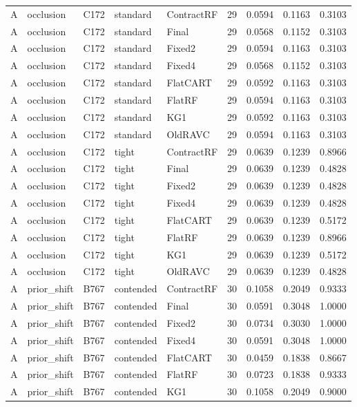 \begin{longtable}{@{}lllllllll@{}}
A & occlusion & C172 & standard & ContractRF & 29 & 0.0594 & 0.1163 & 0.3103\\
A & occlusion & C172 & standard & Final & 29 & 0.0568 & 0.1152 & 0.3103\\
A & occlusion & C172 & standard & Fixed2 & 29 & 0.0594 & 0.1163 & 0.3103\\
A & occlusion & C172 & standard & Fixed4 & 29 & 0.0568 & 0.1152 & 0.3103\\
A & occlusion & C172 & standard & FlatCART & 29 & 0.0592 & 0.1163 & 0.3103\\
A & occlusion & C172 & standard & FlatRF & 29 & 0.0594 & 0.1163 & 0.3103\\
A & occlusion & C172 & standard & KG1 & 29 & 0.0592 & 0.1163 & 0.3103\\
A & occlusion & C172 & standard & OldRAVC & 29 & 0.0594 & 0.1163 & 0.3103\\
A & occlusion & C172 & tight & ContractRF & 29 & 0.0639 & 0.1239 & 0.8966\\
A & occlusion & C172 & tight & Final & 29 & 0.0639 & 0.1239 & 0.4828\\
A & occlusion & C172 & tight & Fixed2 & 29 & 0.0639 & 0.1239 & 0.4828\\
A & occlusion & C172 & tight & Fixed4 & 29 & 0.0639 & 0.1239 & 0.4828\\
A & occlusion & C172 & tight & FlatCART & 29 & 0.0639 & 0.1239 & 0.5172\\
A & occlusion & C172 & tight & FlatRF & 29 & 0.0639 & 0.1239 & 0.8966\\
A & occlusion & C172 & tight & KG1 & 29 & 0.0639 & 0.1239 & 0.5172\\
A & occlusion & C172 & tight & OldRAVC & 29 & 0.0639 & 0.1239 & 0.4828\\
A & prior\_shift & B767 & contended & ContractRF & 30 & 0.1058 & 0.2049 & 0.9333\\
A & prior\_shift & B767 & contended & Final & 30 & 0.0591 & 0.3048 & 1.0000\\
A & prior\_shift & B767 & contended & Fixed2 & 30 & 0.0734 & 0.3030 & 1.0000\\
A & prior\_shift & B767 & contended & Fixed4 & 30 & 0.0591 & 0.3048 & 1.0000\\
A & prior\_shift & B767 & contended & FlatCART & 30 & 0.0459 & 0.1838 & 0.8667\\
A & prior\_shift & B767 & contended & FlatRF & 30 & 0.0723 & 0.1838 & 0.9333\\
A & prior\_shift & B767 & contended & KG1 & 30 & 0.1058 & 0.2049 & 0.9000\\

\end{longtable}
